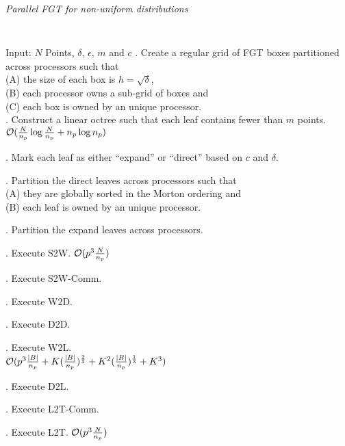 \begin{algorithm}[!h]
\caption{ \label{a:ofgt}
\em Parallel FGT for non-uniform distributions}
{\tt
\begin{algorithmic}
\STATE Input: $N$ Points, $\delta$, $\epsilon$, $m$ and $c$
. Create a regular grid of FGT boxes partitioned across processors such that \\
 (A) the size of each box is $h = \sqrt{\delta}$, \\
 (B) each processor owns a sub-grid of boxes and \\
 (C) each box is owned by an unique processor. \\

. Construct a linear octree such that each leaf contains fewer than $m$ points. \\
\hfill $\mathcal{O}(\frac{N}{n_p} \log{\frac{N}{n_p}} + n_p \log{n_p})$

. Mark each leaf as either ``expand'' or ``direct'' based on $c$ and $\delta$.

. Partition the direct leaves across processors such that \\
  (A) they are globally sorted in the Morton ordering and \\
  (B) each leaf is owned by an unique processor.

. Partition the expand leaves across processors. 

. Execute S2W. \hfill $\mathcal{O}(p^3 \frac{N}{n_p})$

. Execute S2W-Comm. 

. Execute W2D. 

. Execute D2D. 

. Execute W2L. \\
 \hfill $\mathcal{O}(p^3 \frac{|B|}{n_p} + K (\frac{|B|}{n_p})^{\frac{2}{3}} + K^2(\frac{|B|}{n_p})^{\frac{1}{3}} + K^3 )$ 

. Execute D2L. 

. Execute L2T-Comm. 

. Execute L2T. \hfill $\mathcal{O}( p^3\frac{N}{n_p})$
\end{algorithmic}
}
\end{algorithm}


